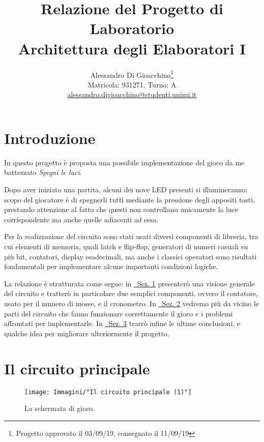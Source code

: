 \documentclass[11pt]{article}
\title{Relazione del Progetto di Laboratorio \\ Architettura degli Elaboratori I}
\author{Alessandro Di Gioacchino\thanks{Progetto approvato il 03/09/19, consegnato il 11/09/19}\\ Matricola: 931271, Turno: A\\ \url{alessandro.digioacchino@studenti.unimi.it}}
\date{}
\begin{document}
\maketitle
\tableofcontents



\section*{Introduzione}

In questo progetto è proposta una possibile implementazione del gioco da me battezzato {\itshape Spegni le luci}.

Dopo aver iniziato una partita, alcuni dei nove LED presenti si illumineranno: scopo del giocatore è di spegnerli tutti mediante la pressione degli appositi tasti, prestando attenzione al fatto che questi non controllano unicamente la luce corrispondente ma anche quelle adiacenti ad essa.

Per la realizzazione del circuito sono stati usati diversi componenti di libreria, tra cui elementi di memoria, quali latch e flip-flop, generatori di numeri casuali su più bit, contatori, display esadecimali, ma anche i classici operatori sono risultati fondamentali per implementare alcune importanti condizioni logiche.

La relazione è strutturata come segue: in \underline{~\hyperref[sec:ilcircuitoprincipale]{Sez. 1}} presenterò una visione generale del circuito e tratterò in particolare due semplici componenti, ovvero il contatore, usato per il numero di mosse, e il cronometro. In \underline{~\hyperref[sec:icomponentifondamentali]{Sez. 2}} vedremo più da vicino le parti del circuito che fanno funzionare correttamente il gioco e i problemi affrontati per implementarle. In \underline{~\hyperref[sec:considerazionifinali]{Sez. 3}} trarrò infine le ultime conclusioni, e qualche idea per migliorare ulteriormente il progetto.



\section{Il circuito principale}
\label{sec:ilcircuitoprincipale}

\begin{figure}[H]
\centering
\texttt{[image: Immagini/"Il circuito principale (1)"]}
\caption{{\small La schermata di gioco.}}
\label{fig:ilcircuitoprincipale(1)}
\end{figure}
\end{document}
